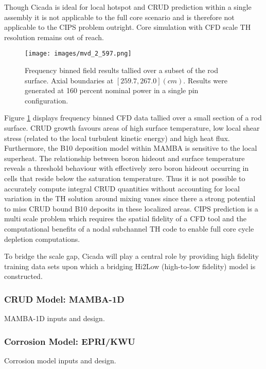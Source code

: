\documentclass[10pt,a4paper]{report}
\begin{document}
Though Cicada is ideal for local hotspot and CRUD prediction within a single assembly it is not applicable to the full core scenario and is therefore not applicable to the CIPS problem outright.   Core simulation with CFD scale TH resolution remains out of reach.

\begin{figure}[h!]
\centering
\texttt{[image: images/mvd\_2\_597.png]}
\caption{Frequency binned field results tallied over a subset of the rod surface.   Axial boundaries at $[259.7, 267.0](cm)$.  Results were generated at 160 percent nominal power in a single pin configuration. }
\label{pairgrid}
\end{figure}

Figure \ref{pairgrid} displays frequency binned CFD data tallied over a small section of a rod surface. CRUD growth favours areas of high surface temperature, low local shear stress (related to the local turbulent kinetic energy) and high heat flux.   Furthermore, the B10 deposition model within MAMBA is sensitive to the local superheat.  The relationship between boron hideout and surface temperature reveals a threshold behaviour with effectively zero boron hideout occurring in cells that reside below the saturation temperature.  Thus it is not possible to accurately compute integral CRUD quantities without accounting for local variation in the TH solution around mixing vanes since there a strong potential to miss CRUD bound B10 deposits in these localized areas.  CIPS prediction is a multi scale problem which requires the spatial fidelity of a CFD tool and the computational benefits of a nodal subchannel TH code to enable full core cycle depletion computations.

To bridge the scale gap, Cicada will play a central role by providing high fidelity training data sets upon which a bridging Hi2Low (high-to-low fidelity) model is constructed.  

\subsubsection{CRUD Model: MAMBA-1D}

MAMBA-1D inputs and design.

\subsubsection{Corrosion Model: EPRI/KWU}

Corrosion model inputs and design.
\end{document}
